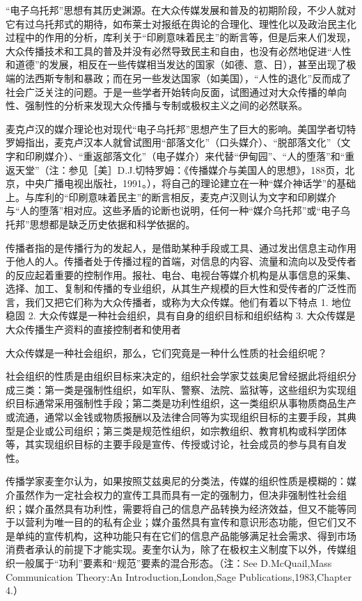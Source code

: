 \documentclass[UTF8,12pt]{ctexart}
\numberwithin{equation}{section} %
\numberwithin{figure}{section}
\numberwithin{table}{section}
\begin{document}
	
	“电子乌托邦”思想有其历史渊源。在大众传媒发展和普及的初期阶段，不少人就对它有过乌托邦式的期待，如布莱士对报纸在舆论的合理化、理性化以及政治民主化过程中的作用的分析，库利关于“印刷意味着民主”的断言等，但是后来人们发现，大众传播技术和工具的普及并没有必然导致民主和自由，也没有必然地促进“人性和道德”的发展，相反在一些传媒相当发达的国家（如德、意、日），甚至出现了极端的法西斯专制和暴政；而在另一些发达国家（如美国），“人性的退化”反而成了社会广泛关注的问题。于是一些学者开始转向反面，试图通过对大众传播的单向性、强制性的分析来发现大众传播与专制或极权主义之间的必然联系。
	
	麦克卢汉的媒介理论也对现代“电子乌托邦”思想产生了巨大的影响。美国学者切特罗姆指出，麦克卢汉本人就曾试图用“部落文化”（口头媒介）、“脱部落文化”（文字和印刷媒介）、“重返部落文化”（电子媒介）来代替“伊甸园”、“人的堕落”和“重返天堂”（注：参见［美］D.J.切特罗姆：《传播媒介与美国人的思想》，188页，北京，中央广播电视出版社，1991。），将自己的理论建立在一种“媒介神话学”的基础上。与库利的“印刷意味着民主”的断言相反，麦克卢汉则认为文字和印刷媒介与“人的堕落”相对应。这些矛盾的论断也说明，任何一种“媒介乌托邦”或“电子乌托邦”思想都是缺乏历史依据和科学依据的。
	
	
	传播者指的是传播行为的发起人，是借助某种手段或工具、通过发出信息主动作用于他人的人。传播者处于传播过程的首端，对信息的内容、流量和流向以及受传者的反应起着重要的控制作用。报社、电台、电视台等媒介机构是从事信息的采集、选择、加工、复制和传播的专业组织，从其生产规模的巨大性和受传者的广泛性而言，我们又把它们称为大众传播者，或称为大众传媒。他们有着以下特点
	1. 地位稳固
	2. 大众传媒是一种社会组织，具有自身的组织目标和组织结构
	3. 大众传媒是大众传播生产资料的直接控制者和使用者
	
	大众传媒是一种社会组织，那么，它们究竟是一种什么性质的社会组织呢？
	
	社会组织的性质是由组织目标来决定的，组织社会学家艾兹奥尼曾经据此将组织分成三类：第一类是强制性组织，如军队、警察、法院、监狱等，这些组织为实现组织目标通常采用强制性手段；第二类是功利性组织，这一类组织从事物质商品生产或流通，通常以金钱或物质报酬以及法律合同等为实现组织目标的主要手段，其典型是企业或公司组织；第三类是规范性组织，如宗教组织、教育机构或科学团体等，其实现组织目标的主要手段是宣传、传授或讨论，社会成员的参与具有自发性。
	
	传播学家麦奎尔认为，如果按照艾兹奥尼的分类法，传媒的组织性质是模糊的：媒介虽然作为一定社会权力的宣传工具而具有一定的强制力，但决非强制性社会组织；媒介虽然具有功利性，需要将自己的信息产品转换为经济效益，但又不能等同于以营利为唯一目的的私有企业；媒介虽然具有宣传和意识形态功能，但它们又不是单纯的宣传机构，这种功能只有在它们的信息产品能够满足社会需求、得到市场消费者承认的前提下才能实现。麦奎尔认为，除了在极权主义制度下以外，传媒组织一般属于“功利”要素和“规范”要素的混合形态。（注：See D.McQuail,Mass Communication Theory:An Introduction,London,Sage Publications,1983,Chapter 4.）
	
\end{document}
